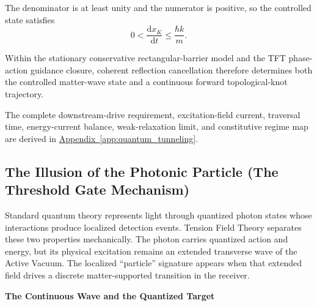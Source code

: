 The denominator is at least unity and the numerator is positive, so the controlled state satisfies
\begin{equation}
    0
    <
    \frac{\mathrm dx_K}{\mathrm dt}
    \leq
    \frac{\hbar k}{m}.
\end{equation}

Within the stationary conservative rectangular-barrier model and the TFT phase-action guidance closure, coherent reflection cancellation therefore determines both the controlled matter-wave state and a continuous forward topological-knot trajectory.

The complete downstream-drive requirement, excitation-field current, traversal time, energy-current balance, weak-relaxation limit, and constitutive regime map are derived in
\hyperref[app:quantum_tunneling]{Appendix~\ref*{app:quantum_tunneling}}.


\subsection{The Illusion of the Photonic Particle (The Threshold Gate Mechanism)}

Standard quantum theory represents light through quantized photon states whose interactions produce localized detection events. Tension Field Theory separates these two properties mechanically. The photon carries quantized action and energy, but its physical excitation remains an extended transverse wave of the Active Vacuum. The localized ``particle'' signature appears when that extended field drives a discrete matter-supported transition in the receiver.

\vspace{0.5em}
\noindent\textbf{The Continuous Wave and the Quantized Target}

